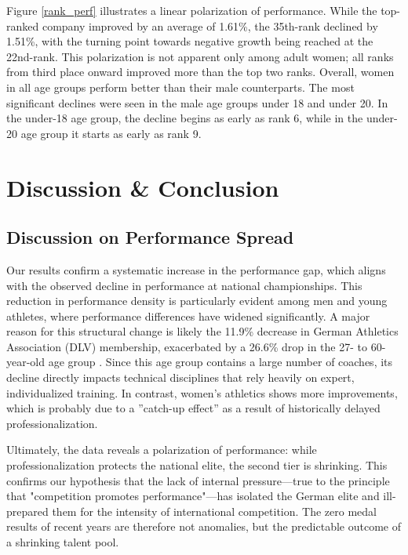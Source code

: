 \documentclass{article}
\begin{document}
Figure \ref{rank_perf} illustrates a linear polarization of performance. While the top-ranked company improved by an average of 1.61\%, the 35th-rank declined by 1.51\%, with the turning point towards negative growth being reached at the 22nd-rank. This polarization is not apparent only among adult women; all ranks from third place onward improved more than the top two ranks. Overall, women in all age groups perform better than their male counterparts. The most significant declines were seen in the male age groups under 18 and under 20. In the under-18 age group, the decline begins as early as rank 6, while in the under-20 age group it starts as early as rank 9.

\section{Discussion \& Conclusion}\label{sec:conclusion}

\subsection*{Discussion on Performance Spread}

Our results confirm a systematic increase in the performance gap, which aligns with the observed decline in performance at national championships. This reduction in performance density is particularly evident among men and young athletes, where performance differences have widened significantly. A major reason for this structural change is likely the 11.9\% decrease in German Athletics Association (DLV) membership, exacerbated by a 26.6\% drop in the 27- to 60-year-old age group \citep{LeichtathletikPortalDownloads}. Since this age group contains a large number of coaches, its decline directly impacts technical disciplines that rely heavily on expert, individualized training.  In contrast, women’s athletics shows
more improvements, which is probably due to a ”catch-up
effect” as a result of historically delayed professionalization.

Ultimately, the data reveals a polarization of performance: while professionalization protects the national elite, the second tier is shrinking. This confirms our hypothesis that the lack of internal pressure—true to the principle that "competition promotes performance"—has isolated the German elite and ill-prepared them for the intensity of international competition. The zero medal results of recent years are therefore not anomalies, but the predictable outcome of a shrinking talent pool.
\end{document}
